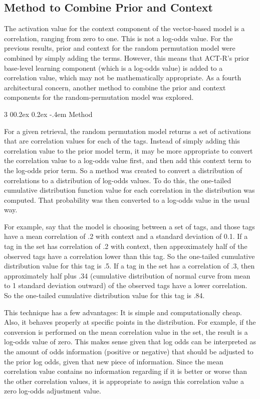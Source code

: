 \documentclass[man,floatsintext,donotrepeattitle]{apa6}
\makeatletter
\renewcommand{\subsubsection}{%
  \@startsection
  {subsubsection}%
  {3}%
  {\parindent}%
  {0\baselineskip \@plus 0.2ex \@minus 0.2ex}%
  {-.4em}%
  {\normalfont\normalsize\bfseries\addperi}}
\makeatother
\begin{document}
\subsection{Method to Combine Prior and Context}

The activation value for the context component of the vector-based model is a correlation, ranging from zero to one.
This is not a log-odds value.
For the previous results, prior and context for the random permutation model were combined by simply adding the terms.
However, this means that ACT-R's prior base-level learning component (which is a log-odds value) is added to a correlation value, which may not be mathematically appropriate.
As a fourth architectural concern, another method to combine the prior and context components for the random-permutation model was explored.

\subsubsection{Method}

For a given retrieval, the random permutation model returns a set of activations that are correlation values for each of the tags.
Instead of simply adding this correlation value to the prior model term, it may be more appropriate to convert the correlation value to a log-odds value first, and then add this context term to the log-odds prior term.
So a method was created to convert a distribution of correlations to a distribution of log-odds values.
To do this, the one-tailed cumulative distribution function value for each correlation in the distribution was computed.
That probability was then converted to a log-odds value in the usual way. 

For example, say that the model is choosing between a set of tags, and those tags have a mean correlation of .2 with context and a standard deviation of 0.1.
If a tag in the set has correlation of .2 with context, then approximately half of the observed tags have a correlation lower than this tag.
So the one-tailed cumulative distribution value for this tag is .5.
If a tag in the set has a correlation of .3, then approximately half plus .34 (cumulative distribution of normal curve from mean to 1 standard deviation outward) of the observed tags have a lower correlation.
So the one-tailed cumulative distribution value for this tag is .84.

This technique has a few advantages: 
It is simple and computationally cheap.
Also, it behaves properly at specific points in the distribution.
For example, if the conversion is performed on the mean correlation value in the set, the result is a log-odds value of zero.
This makes sense given that log odds can be interpreted as the amount of odds information (positive or negative) that should be adjusted to the prior log odds, given that new piece of information.
Since the mean correlation value contains no information regarding if it is better or worse than the other correlation values, it is appropriate to assign this correlation value a zero log-odds adjustment value.
\end{document}
